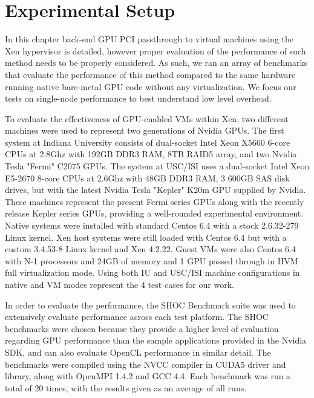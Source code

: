 \section{Experimental Setup} 


In this chapter back-end GPU PCI passthrough to virtual machines using the Xen hypervisor is detailed, however proper evaluation of the performance of such method needs to be properly considered. As such, we ran an array of benchmarks that evaluate the performance of this method compared to the same hardware running native bare-metal GPU code without any virtualization. We focus our tests on single-node performance to best understand low level overhead.


To evaluate the effectiveness of GPU-enabled VMs within Xen, two different machines were used to represent two generations of Nvidia GPUs. The first system at Indiana University consists of dual-socket Intel Xeon X5660 6-core CPUs at 2.8Ghz with 192GB DDR3 RAM, 8TB RAID5 array, and two Nvidia Tesla "Fermi" C2075 GPUs. The system at USC/ISI uses a dual-socket Intel Xeon E5-2670 8-core CPUs at 2.6Ghz with 48GB DDR3 RAM, 3 600GB SAS disk drives, but with the latest Nvidia Tesla  "Kepler" K20m GPU supplied by Nvidia.  These machines represent the present Fermi series GPUs along with the recently release Kepler series GPUs, providing a well-rounded experimental environment. Native systems were installed with standard Centos 6.4 with a stock 2.6.32-279 Linux kernel. Xen host systems were still loaded with Centos 6.4 but with a custom 3.4.53-8 Linux kernel and Xen 4.2.22.  Guest VMs were also Centos 6.4 with N-1 processors and 24GB of memory and 1 GPU passed through in HVM full virtualization mode. Using both IU and USC/ISI machine configurations in native and VM modes represent the 4 test cases for our work.


In order to evaluate the performance, the SHOC Benchmark suite \cite{danalis2010scalable} was used to extensively evaluate performance across each test platform. The SHOC benchmarks were chosen because they provide a higher level of evaluation regarding GPU performance than the sample applications provided in the Nvidia SDK, and can also evaluate OpenCL performance in similar detail. The benchmarks were compiled using the NVCC compiler in CUDA5 driver and library, along with OpenMPI 1.4.2 and GCC 4.4. Each benchmark was run a total of 20 times, with the results given as an average of all runs. 


